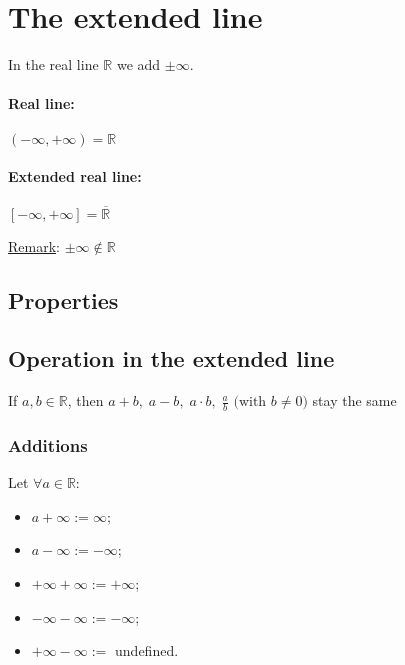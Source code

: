 \documentclass{article}
\newcommand{\figbox}[1]{ 
    \begin{figure*}[ht!]        
        \begin{center}            
            \fbox{#1}        
        \end{center}    
    \end{figure*}
}
\newcommand{\rem}{\underline{Remark}: }
\newcommand{\sht}{\ |\ }
\begin{document}
\section{The extended line}
In the real line $\mathbb{R}$ we add $\pm \infty$.

\paragraph{Real line:} $(-\infty, +\infty) = \mathbb{R}$ 

\paragraph{Extended real line:} $\left[-\infty, +\infty\right] = \overline{\mathbb{R}}$

\vspace*{.5cm}
\begin{center}
\end{center}

\rem{$\pm \infty \notin \mathbb{R}$}

\subsection{Properties}
\figbox{$\forall x \in \mathbb{R} \ \sht \ \infty > x \ \sht \ -\infty < 0$}

\newpage
\subsection{Operation in the extended line}
If $a,b \in \mathbb{R}$, then $a+b,\; a-b,\; a\cdot b,\; \frac{a}{b} \text{ (with } b\neq 0 )$ stay the same

\subsubsection{Additions}
Let $\forall a \in \mathbb{R}$:
\begin{itemize}
    \item $a+\infty := \infty$;
    \item $a-\infty := -\infty$;
    \item $+\infty + \infty := +\infty$;
    \item $-\infty - \infty := -\infty$;
    \item $+\infty - \infty :=$ undefined.
\end{itemize}
\end{document}
